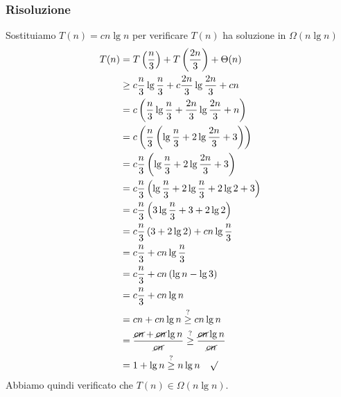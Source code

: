 \documentclass[a4paper]{article}
\begin{document}
\subsubsection{Risoluzione}
Sostituiamo \( T(n) = cn \lg n \) per verificare \( T(n) \) ha soluzione in 
\( \Omega(n \lg n) \) 
\[
  \begin{aligned}
    T(n) &= T\left(\frac{n}{3}\right) + T\left(\frac{2n}{3}\right) + \Theta(n)\\
         &\ge c \frac{n}{3} \lg \frac{n}{3} + c \frac{2n}{3} \lg \frac{2n}{3} + cn \\
         &= c \left( \frac{n}{3} \lg \frac{n}{3} +\frac{2n}{3} \lg \frac{2n}{3} + n \right) \\
         &= c \left( \frac{n}{3} \left( \lg \frac{n}{3} + 2 \lg \frac{2n}{3} + 3 \right)  \right) \\
         &= c \frac{n}{3} \left( \lg \frac{n}{3} + 2 \lg \frac{2n}{3} + 3 \right) \\
         &= c \frac{n}{3} \left( \lg \frac{n}{3} + 2 \lg \frac{n}{3} + 2 \lg 2 + 3 \right) \\
         &= c \frac{n}{3} \left( 3 \lg \frac{n}{3} + 3 + 2 \lg 2 \right) \\
         &= c \frac{n}{3} \left( 3 + 2 \lg 2 \right) + c n \lg \frac{n}{3} \\
         &= c \frac{n}{3} + c n \lg \frac{n}{3} \\
         &= c \frac{n}{3} + c n \left( \lg n - \lg 3 \right) \\
         &= c \frac{n}{3} + c n \lg n \\
         &= cn + cn \lg n \stackrel{?}{\ge} cn \lg n \\
         &= \frac{\cancel{cn} + \cancel{cn} \lg n}{\cancel{cn}} \stackrel{?}{\ge}
         \frac{\cancel{cn} \lg n}{\cancel{cn}} \\
         &= 1 + \lg n \stackrel{?}{\ge} n \lg n \quad \surd
  \end{aligned}
\] 
Abbiamo quindi verificato che \( T(n) \in \Omega(n \lg n) \).
\end{document}
